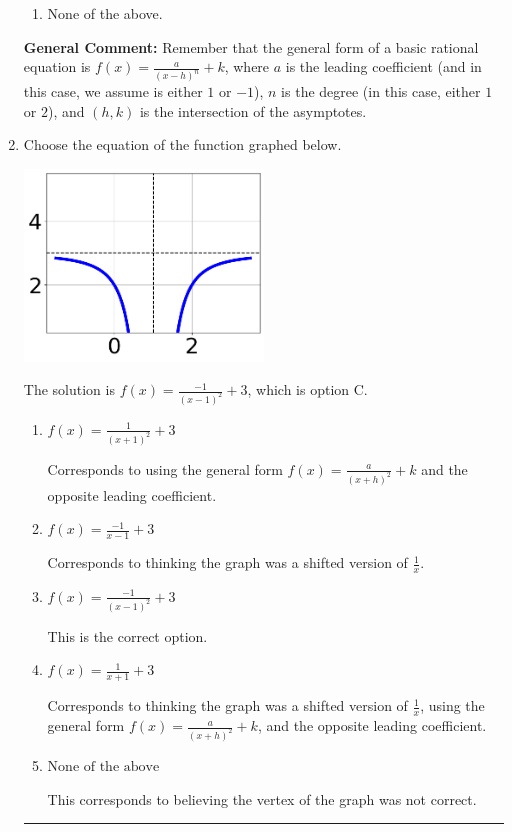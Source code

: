 \documentclass{extbook}[14pt]
\newcommand{\litem}[1]{\item #1

\rule{\textwidth}{0.4pt}}
\begin{document}
\begin{enumerate}
{\begin{enumerate}[label=\Alph*.]
\begin{multicols}{2}
\end{multicols}\item None of the above.\end{enumerate}
\textbf{General Comment:} Remember that the general form of a basic rational equation is $ f(x) = \frac{a}{(x-h)^n} + k$, where $a$ is the leading coefficient (and in this case, we assume is either $1$ or $-1$), $n$ is the degree (in this case, either $1$ or $2$), and $(h, k)$ is the intersection of the asymptotes.
}
\litem{
Choose the equation of the function graphed below.

\begin{center}
    \includegraphics[width=0.5\textwidth]{../Figures/rationalGraphToEquationCopyB.png}
\end{center}


The solution is \( f(x) = \frac{-1}{(x - 1)^2} + 3 \), which is option C.\begin{enumerate}[label=\Alph*.]
\item \( f(x) = \frac{1}{(x + 1)^2} + 3 \)

Corresponds to using the general form $f(x) = \frac{a}{(x+h)^2}+k$ and the opposite leading coefficient.
\item \( f(x) = \frac{-1}{x - 1} + 3 \)

Corresponds to thinking the graph was a shifted version of $\frac{1}{x}$.
\item \( f(x) = \frac{-1}{(x - 1)^2} + 3 \)

This is the correct option.
\item \( f(x) = \frac{1}{x + 1} + 3 \)

Corresponds to thinking the graph was a shifted version of $\frac{1}{x}$, using the general form $f(x) = \frac{a}{(x+h)^2}+k$, and the opposite leading coefficient.
\item \( \text{None of the above} \)

This corresponds to believing the vertex of the graph was not correct.
\end{enumerate}

}
\end{enumerate}
\end{document}
